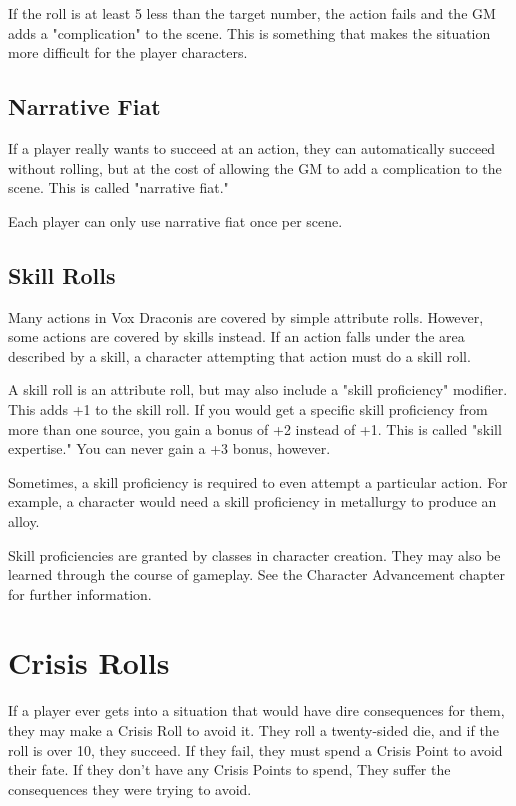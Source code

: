 \begin{multicols}{2}
If the roll is at least 5 less than the target number, the action fails
and the GM adds a "complication" to the scene. This is something that
makes the situation more difficult for the player characters. 

\subsection{Narrative Fiat}

If a player really wants to succeed at an action, they can automatically
succeed without rolling, but at the cost of allowing the GM to add a
complication to the scene. This is called "narrative fiat." 

Each player can only use narrative fiat once per scene.

\subsection{Skill Rolls}

Many actions in Vox Draconis are covered by simple attribute
rolls. However, some actions are covered by skills instead.
If an action falls under the area described by a skill, a
character attempting that action must do a skill roll.

A skill roll is an attribute roll, but may also include a "skill
proficiency" modifier. This adds +1 to the skill roll. 
If you would get a specific skill proficiency from more than one source, you gain a bonus of +2 instead of +1.
This is called "skill expertise." You can never gain a +3 bonus, however.

Sometimes, a skill proficiency is required to even attempt a
particular action. For example, a character would need a skill
proficiency in metallurgy to produce an alloy.

Skill proficiencies are granted by classes in character creation.
They may also be learned through the course of gameplay.
See the Character Advancement chapter for further information.

\section{Crisis Rolls}

If a player ever gets into a situation that would have dire
consequences for them, they may make a Crisis Roll to avoid it.
They roll a twenty-sided die, and if the roll is over 10, they
succeed. If they fail, they must spend a Crisis Point to avoid
their fate. If they don't have any Crisis Points to spend, They
suffer the consequences they were trying to avoid.


\end{multicols}
